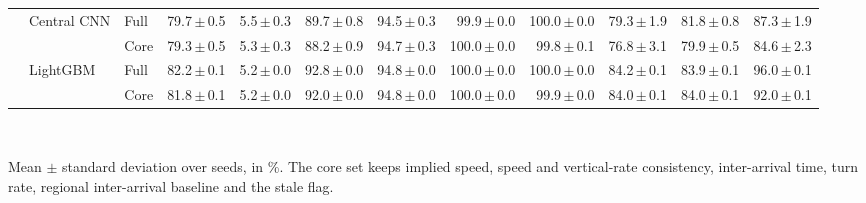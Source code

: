 \begin{table}[t]
\begin{tabular}{lllrrrrrrrrr}
 & Central CNN & Full & 79.7{\,}$\pm${\,}0.5 & 5.5{\,}$\pm${\,}0.3 & 89.7{\,}$\pm${\,}0.8 & 94.5{\,}$\pm${\,}0.3 & 99.9{\,}$\pm${\,}0.0 & 100.0{\,}$\pm${\,}0.0 & 79.3{\,}$\pm${\,}1.9 & 81.8{\,}$\pm${\,}0.8 & 87.3{\,}$\pm${\,}1.9 \\
 &  & Core & 79.3{\,}$\pm${\,}0.5 & 5.3{\,}$\pm${\,}0.3 & 88.2{\,}$\pm${\,}0.9 & 94.7{\,}$\pm${\,}0.3 & 100.0{\,}$\pm${\,}0.0 & 99.8{\,}$\pm${\,}0.1 & 76.8{\,}$\pm${\,}3.1 & 79.9{\,}$\pm${\,}0.5 & 84.6{\,}$\pm${\,}2.3 \\
 & LightGBM & Full & 82.2{\,}$\pm${\,}0.1 & 5.2{\,}$\pm${\,}0.0 & 92.8{\,}$\pm${\,}0.0 & 94.8{\,}$\pm${\,}0.0 & 100.0{\,}$\pm${\,}0.0 & 100.0{\,}$\pm${\,}0.0 & 84.2{\,}$\pm${\,}0.1 & 83.9{\,}$\pm${\,}0.1 & 96.0{\,}$\pm${\,}0.1 \\
 &  & Core & 81.8{\,}$\pm${\,}0.1 & 5.2{\,}$\pm${\,}0.0 & 92.0{\,}$\pm${\,}0.0 & 94.8{\,}$\pm${\,}0.0 & 100.0{\,}$\pm${\,}0.0 & 99.9{\,}$\pm${\,}0.0 & 84.0{\,}$\pm${\,}0.1 & 84.0{\,}$\pm${\,}0.1 & 92.0{\,}$\pm${\,}0.1 \\
\bottomrule
\end{tabular}
\\[2pt]
\parbox{\linewidth}{\scriptsize Mean $\pm$ standard deviation over  seeds, in \%. The core set keeps implied speed, speed and vertical-rate consistency, inter-arrival time, turn rate, regional inter-arrival baseline and the stale flag.}
\end{table}
